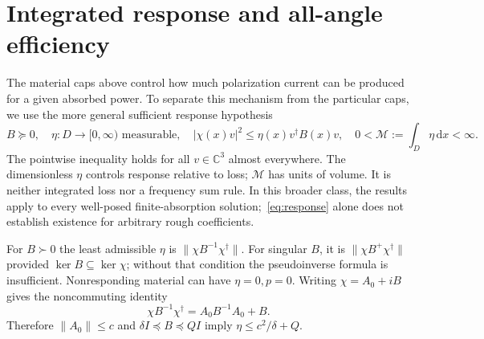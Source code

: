 \documentclass[11pt]{article}
\newcommand{\dd}{\,\mathrm{d}}
\newcommand{\norm}[1]{\lVert #1\rVert}
\newcommand{\abs}[1]{\lvert #1\rvert}
\begin{document}
\section{Integrated response and all-angle efficiency}\label{sec:response}
The material caps above control how much polarization current can be produced for a given absorbed power. To separate this mechanism from the particular caps, we use the more general sufficient response hypothesis
\begin{equation}\label{eq:response}
 B\succeq0,\quad \eta:D\to[0,\infty)\text{ measurable},\quad
 \abs{\chi(x)v}^2\leq\eta(x)v^\dagger B(x)v,\quad
 0<\mathcal M:=\int_D\eta\dd x<\infty.
\end{equation}
The pointwise inequality holds for all $v\in\mathbb C^3$ almost everywhere. The dimensionless $\eta$ controls response relative to loss; $\mathcal M$ has units of volume. It is neither integrated loss nor a frequency sum rule. In this broader class, the results apply to every well-posed finite-absorption solution;~\eqref{eq:response} alone does not establish existence for arbitrary rough coefficients.

For $B\succ0$ the least admissible $\eta$ is $\norm{\chi B^{-1}\chi^\dagger}$. For singular $B$, it is $\norm{\chi B^+\chi^\dagger}$ provided $\ker B\subseteq\ker\chi$; without that condition the pseudoinverse formula is insufficient. Nonresponding material can have $\eta=0,p=0$. Writing $\chi=A_0+iB$ gives the noncommuting identity
\begin{equation}\label{eq:response-identity}
 \chi B^{-1}\chi^\dagger=A_0B^{-1}A_0+B.
\end{equation}
Therefore $\norm{A_0}\leq c$ and $\delta I\preceq B\preceq QI$ imply $\eta\leq c^2/\delta+Q$.
\end{document}
